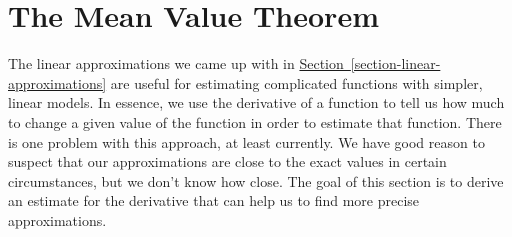 \documentclass[10pt,]{book}
\theoremstyle{ptxplainnotitle}
\theoremstyle{ptxplaintitle}
\theoremstyle{ptxplainnotitle}
\theoremstyle{ptxplaintitle}
\theoremstyle{ptxplainnotitle}
\theoremstyle{ptxplaintitle}
\theoremstyle{ptxdefinitionnotitle}
\theoremstyle{ptxdefinitiontitle}
\theoremstyle{ptxdefinitionnotitle}
\theoremstyle{ptxdefinitiontitle}
\theoremstyle{ptxdefinitionnotitle}
\theoremstyle{ptxdefinitiontitle}
\theoremstyle{ptxdefinitionnotitle}
\theoremstyle{ptxdefinitiontitle}
\theoremstyle{ptxdefinitionnotitle}
\theoremstyle{ptxdefinitiontitle}
\numberwithin{equation}{section}
\begin{document}
\typeout{************************************************}
\typeout{************************************************}
\section[{The Mean Value Theorem}]{The Mean Value Theorem}\label{section-the-mean-value-theorem}
\hypertarget{p-328}{}%
The linear approximations we came up with in \hyperref[section-linear-approximations]{Section~\ref{section-linear-approximations}} are useful for estimating complicated functions with simpler, linear models. In essence, we use the derivative of a function to tell us how much to change a given value of the function in order to estimate that function. There is one problem with this approach, at least currently. We have good reason to suspect that our approximations are close to the exact values in certain circumstances, but we don't know how close. The goal of this section is to derive an estimate for the derivative that can help us to find more precise approximations.%
\typeout{************************************************}
\typeout{************************************************}
\end{document}
